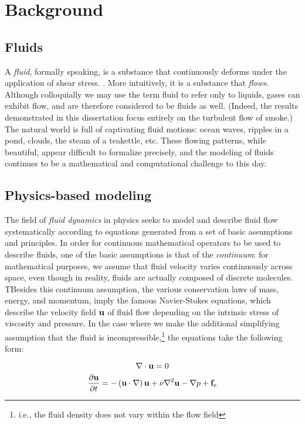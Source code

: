 \chapter[Background]{Background}
\section{Fluids}

A {\em fluid}, formally speaking, is a substance that continuously deforms under the application of shear stress. . More intuitively, it is a substance that {\em flows}. Although colloquially we may use the term fluid to refer only to liquids, gases can exhibit flow, and are therefore considered to be fluids as well. (Indeed, the results demonstrated in this dissertation focus entirely on the turbulent flow of smoke.) The natural world is full of captivating fluid motions: ocean waves, ripples in a pond, clouds, the steam of a teakettle, etc. These flowing patterns, while beautiful, appear difficult to formalize precisely, and the modeling of fluids continues to be a mathematical and computational challenge to this day.

\section{Physics-based modeling}
The field of {\em fluid dynamics} in physics seeks to model and describe fluid flow systematically according to equations generated from a set of basic assumptions and principles. In order for continuous mathematical operators to be used to describe fluids, one of the basic assumptions is that of the {\em continuum}: for mathematical purposes, we assume that fluid velocity varies continuously across space, even though in reality, fluids are actually composed of discrete molecules. TBesides this continuum assumption, the various conservation laws of mass, energy, and momentum, imply the famous Navier-Stokes equations, which describe the velocity field $\mathbf{u}$ of fluid flow depending on the intrinsic stress of viscosity and pressure. In the case where we make the additional simplifying assumption that the fluid is incompressible,\footnote{i.e., the fluid density does not vary within the flow field} the equations take the following form:

\begin{equation}
\label{eq:incompress}
\nabla \cdot \mathbf{u} = 0
\end{equation}
\begin{equation}
\label{eq:momentum}
\frac{\partial \mathbf{u}}{\partial t} = -\left(\mathbf{u} \cdot \nabla \right)\mathbf{u} + \nu \nabla^{2}\mathbf{u} - \nabla{p} + \mathbf{f}_e
\end{equation}

